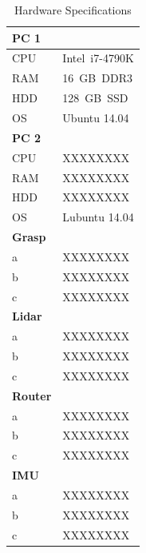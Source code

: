 \begin{table}[htbp]
	\label{tab:hw}
	\caption{Hardware Specifications}
	\centering
	\begin{tabular}{ | p{1.5cm} | p{3cm} | }
		\hline
		\bfseries{PC 1} &  \\
		\hline
		CPU & Intel~i7-4790K \\
		RAM & 16~GB~DDR3 \\
		HDD & 128~GB~SSD \\
		OS & Ubuntu 14.04 \\
		\hline \hline
		\bfseries{PC 2} &  \\
		\hline
		CPU & XXXXXXXX \\
		RAM & XXXXXXXX \\
		HDD & XXXXXXXX \\
		OS & Lubuntu 14.04 \\
		\hline \hline
		\bfseries{Grasp} &  \\
		\hline
		a & XXXXXXXX \\
		b & XXXXXXXX \\
		c & XXXXXXXX \\
		\hline \hline
		\bfseries{Lidar} &  \\
		\hline
		a & XXXXXXXX \\
		b & XXXXXXXX \\
		c & XXXXXXXX \\
		\hline \hline
		\bfseries{Router} &  \\
		\hline
		a & XXXXXXXX \\
		b & XXXXXXXX \\
		c & XXXXXXXX \\
		\hline \hline
		\bfseries{IMU} &  \\
		\hline
		a & XXXXXXXX \\
		b & XXXXXXXX \\
		c & XXXXXXXX \\
		\hline
	\end{tabular}
	\label{tab:hw}
\end{table}
	




